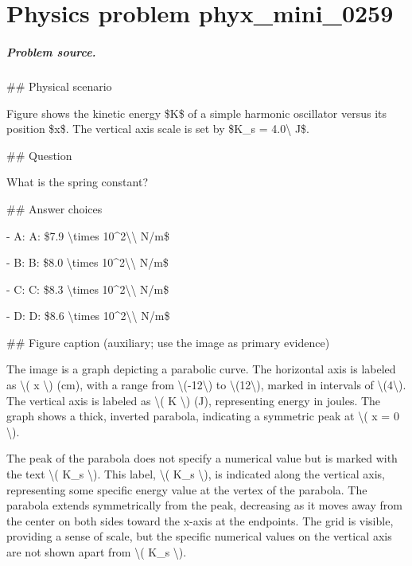 
\chapter{Physics problem phyx\_mini\_0259}
\label{ch:PhyXMiniProblems_problem_phyx_mini_0259}

\paragraph{Problem source.}
\#\# Physical scenario

Figure shows the kinetic energy \$K\$ of a simple harmonic oscillator versus its position \$x\$. The vertical axis scale is set by \$K\_s = 4.0\textbackslash{} J\$.

\#\# Question

What is the spring constant?

\#\# Answer choices

- A: A: \$7.9 \textbackslash{}times 10\textasciicircum{}2\textbackslash{}\textbackslash{} N/m\$

- B: B: \$8.0 \textbackslash{}times 10\textasciicircum{}2\textbackslash{}\textbackslash{} N/m\$

- C: C: \$8.3 \textbackslash{}times 10\textasciicircum{}2\textbackslash{}\textbackslash{} N/m\$

- D: D: \$8.6 \textbackslash{}times 10\textasciicircum{}2\textbackslash{}\textbackslash{} N/m\$

\#\# Figure caption (auxiliary; use the image as primary evidence)

The image is a graph depicting a parabolic curve. The horizontal axis is labeled as \textbackslash{}( x \textbackslash{}) (cm), with a range from \textbackslash{}(-12\textbackslash{}) to \textbackslash{}(12\textbackslash{}), marked in intervals of \textbackslash{}(4\textbackslash{}). The vertical axis is labeled as \textbackslash{}( K \textbackslash{}) (J), representing energy in joules. The graph shows a thick, inverted parabola, indicating a symmetric peak at \textbackslash{}( x = 0 \textbackslash{}).

The peak of the parabola does not specify a numerical value but is marked with the text \textbackslash{}( K\_s \textbackslash{}). This label, \textbackslash{}( K\_s \textbackslash{}), is indicated along the vertical axis, representing some specific energy value at the vertex of the parabola. The parabola extends symmetrically from the peak, decreasing as it moves away from the center on both sides toward the x-axis at the endpoints. The grid is visible, providing a sense of scale, but the specific numerical values on the vertical axis are not shown apart from \textbackslash{}( K\_s \textbackslash{}).

